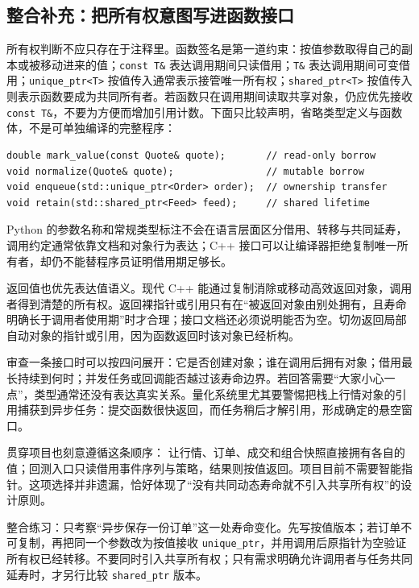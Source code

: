 \subsection{整合补充：把所有权意图写进函数接口}

所有权判断不应只存在于注释里。函数签名是第一道约束：按值参数取得自己的副本或被移动进来的值；\texttt{const T\&} 表达调用期间只读借用；\texttt{T\&} 表达调用期间可变借用；\texttt{unique\_ptr<T>} 按值传入通常表示接管唯一所有权；\texttt{shared\_ptr<T>} 按值传入则表示函数要成为共同所有者。若函数只在调用期间读取共享对象，仍应优先接收 \texttt{const T\&}，不要为方便而增加引用计数。下面只比较声明，省略类型定义与函数体，不是可单独编译的完整程序：

\begin{lstlisting}[numbers=none]
double mark_value(const Quote& quote);       // read-only borrow
void normalize(Quote& quote);                // mutable borrow
void enqueue(std::unique_ptr<Order> order);  // ownership transfer
void retain(std::shared_ptr<Feed> feed);     // shared lifetime
\end{lstlisting}

Python 的参数名称和常规类型标注不会在语言层面区分借用、转移与共同延寿，调用约定通常依靠文档和对象行为表达；C++ 接口可以让编译器拒绝复制唯一所有者，却仍不能替程序员证明借用期足够长。

返回值也优先表达值语义。现代 C++ 能通过复制消除或移动高效返回对象，调用者得到清楚的所有权。返回裸指针或引用只有在“被返回对象由别处拥有，且寿命明确长于调用者使用期”时才合理；接口文档还必须说明能否为空。切勿返回局部自动对象的指针或引用，因为函数返回时该对象已经析构。

审查一条接口时可以按四问展开：它是否创建对象；谁在调用后拥有对象；借用最长持续到何时；并发任务或回调能否越过该寿命边界。若回答需要“大家小心一点”，类型通常还没有表达真实关系。量化系统里尤其要警惕把栈上行情对象的引用捕获到异步任务：提交函数很快返回，而任务稍后才解引用，形成确定的悬空窗口。

贯穿项目也刻意遵循这条顺序： 让行情、订单、成交和组合快照直接拥有各自的值；回测入口只读借用事件序列与策略，结果则按值返回。项目目前不需要智能指针。这项选择并非遗漏，恰好体现了“没有共同动态寿命就不引入共享所有权”的设计原则。

整合练习：只考察“异步保存一份订单”这一处寿命变化。先写按值版本；若订单不可复制，再把同一个参数改为按值接收 \texttt{unique\_ptr}，并用调用后原指针为空验证所有权已经转移。不要同时引入共享所有权；只有需求明确允许调用者与任务共同延寿时，才另行比较 \texttt{shared\_ptr} 版本。

